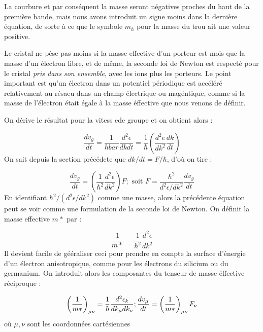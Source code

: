 La courbure et par conséquent la masse seront négatives proches du haut de la
première bande, mais nous avons introduit un signe moins dans la dernière
équation, de sorte à ce que le symbole $m_h$ pour la masse du trou ait une valeur
positive.

Le cristal ne pèse pas moins si la masse effective d'un porteur est mois que la
masse d'un électron libre, et de même, la seconde loi de Newton est respecté pour
le cristal \emph{pris dans son ensemble}, avec les ions plus les porteurs. Le
point important est qu'un électron dans un potentiel périodique est accéléré
relativement au résaeu dans un champ électrique ou magéntique, comme si la masse
de l'électron était égale à la masse éffective que nous venons de définir.

On dérive le résultat pour la vitess ede groupe et on obtient alors :

\begin{equation}
    \frac{dv_g}{dt} = \frac{1}{hbar} \frac{d^2\epsilon}{dk dt} = \frac{1}{\hbar}
    \left( \frac{d^2e}{dk^2} \frac{dk}{dt}\right)
\end{equation}
On sait depuis la section précédete que $dk/dt = F/\hbar$, d'où on tire :

\begin{equation}
    \frac{dv_g}{dt} = \left( \frac{1}{\hbar^2} \frac{d^2\epsilon}{dk^2} \right) F
    ; \text{ soit } F = \frac{\hbar^2}{d^2 \epsilon/dk^2} \frac{dv_g}{dt}
\end{equation}
En identifiant $\hbar^2/(d^2\epsilon/dk^2)$ comme une masse, alors la précédente
équation peut se voir comme une formulation de la seconde loi de Newton. On
définit la masse effective $m*$ par :

\begin{equation}
    \frac{1}{m*} = \frac{1}{\hbar^2} \frac{d^2\epsilon}{dk^2}
\end{equation}
Il devient facile de gééraliser ceci pour prendre en compte la surface d'énergie
d'un électron anisotropique, comme pour les électrons du silicium ou du
germanium. On introduit alors les composantes du tenseur de masse éffective
réciproque :

\begin{equation}
    \left( \frac{1}{m*} \right)_{\mu \nu} = \frac{1}{\hbar}
    \frac{d^2\epsilon_k}{dk_\mu dk_\nu} ; \hfill \frac{dv_\mu}{dt} =
    \left(\frac{1}{m*}\right)_{\mu \nu} F_\nu
\end{equation}
où $\mu, \nu$ sont les coordonnées cartésiennes

